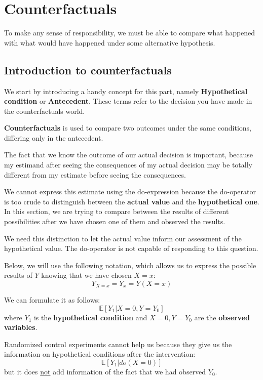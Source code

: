 \chapter{Counterfactuals}
To make any sense of responsibility, we must be able to compare what happened
with what would have happened under some alternative hypothesis.
\section{Introduction to counterfactuals}
We start by introducing a handy concept for this part, namely \textbf{Hypothetical
    condition} or \textbf{Antecedent}. These terms refer to the decision you
have made in the counterfactuals world.

\textbf{Counterfactuals} is used to compare two outcomes under the same
conditions, differing only in the antecedent.

The fact that we know the outcome of our actual decision is important, because
my estimand after seeing the consequences of my actual decision may be totally
different from my estimate before seeing the consequences.

We cannot express this estimate using the do-expression because the do-operator
is too crude to distinguish between the \textbf{actual value} and the
\textbf{hypothetical one}. In this section, we are trying to compare between the
results of different possibilities after we have chosen one of them and observed
the results.

We need this distinction to let the actual value inform our assessment of the
hypothetical value. The do-operator is not capable of responding to this question.

Below, we will use the following notation, which allows us to express the possible
results of $Y$ knowing that we have chosen $X = x$:
\begin{equation}
    Y_{X = x} = Y_x = Y(X = x)
\end{equation}

We can formulate it as follows:
\begin{equation}
    \mathbb{E}[Y_1 | X = 0, Y = Y_0]
\end{equation}
where $Y_1$ is the \textbf{hypothetical condition} and $X = 0,Y = Y_0$ are the
\textbf{observed variables}.

\begin{note}
    Randomized control experiments cannot help us because they give us the information
    on hypothetical conditions after the intervention:
    \begin{equation*}
        \mathbb{E}[Y_1 | do(X = 0)]
    \end{equation*}
    but it does \underline{not} add information of the fact that we had observed $Y_0$.
\end{note}

